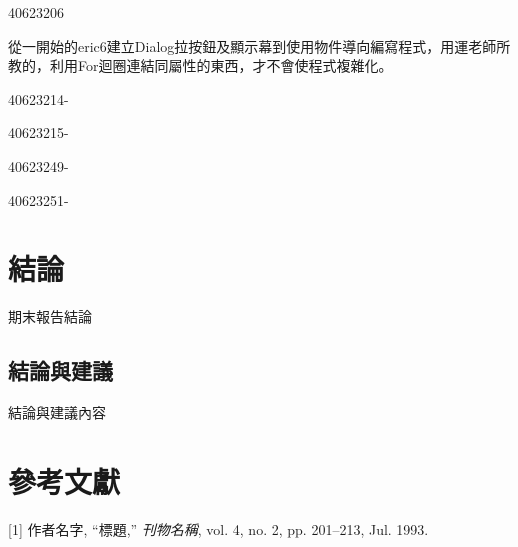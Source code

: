 \documentclass[12pt,,]{report}
\begin{document}
40623206

從一開始的eric6建立Dialog拉按鈕及顯示幕到使用物件導向編寫程式，用運老師所教的，利用For迴圈連結同屬性的東西，才不會使程式複雜化。

40623214-

40623215-

40623249-

40623251-

\hypertarget{ux7d50ux8ad6}{%
\chapter{結論}\label{ux7d50ux8ad6}}

期末報告結論

\hypertarget{ux7d50ux8ad6ux8207ux5efaux8b70}{%
\section{結論與建議}\label{ux7d50ux8ad6ux8207ux5efaux8b70}}

結論與建議內容

\hypertarget{ux53c3ux8003ux6587ux737b}{%
\chapter*{參考文獻}\label{ux53c3ux8003ux6587ux737b}}

\hypertarget{refs}{}
\leavevmode\hypertarget{ref-myart}{}%
{[}1{]} 作者名字, ``標題,'' \emph{刊物名稱}, vol. 4, no. 2, pp.
201--213, Jul. 1993.
\end{document}
